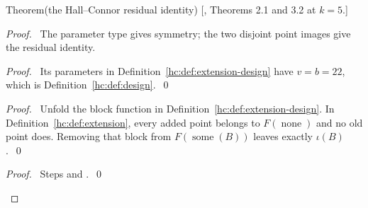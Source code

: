 \begin{mergedproofsection}
\begin{namedresult}{Theorem}{(the Hall--Connor residual identity)}\label{hc:thm:extension}
 \textup{[\cite{HC}, Theorems 2.1 and 3.2 at $k=5$.]}
 \leavevmode\par
\end{namedresult}
\begin{proof}
 \pfsketch\ The parameter type gives symmetry; the two disjoint
 point images give the residual identity.
 \begin{proof}\pf\ Its parameters in Definition~\ref{hc:def:extension-design}
  have $v=b=22$, which is Definition~\ref{hc:def:design}.~\qed\end{proof}
 \begin{proof}\pf\ Unfold the block function in
  Definition~\ref{hc:def:extension-design}. In
  Definition~\ref{hc:def:extension}, every added point belongs to
  $F(\operatorname{none})$ and no old point does. Removing that
  block from $F(\operatorname{some}(B))$ leaves exactly $\iota(B)$.~\qed\end{proof}
 \qedstep
 \begin{proof}\pf\ Steps  and .~\qed\end{proof}
\end{proof}


\end{mergedproofsection}
